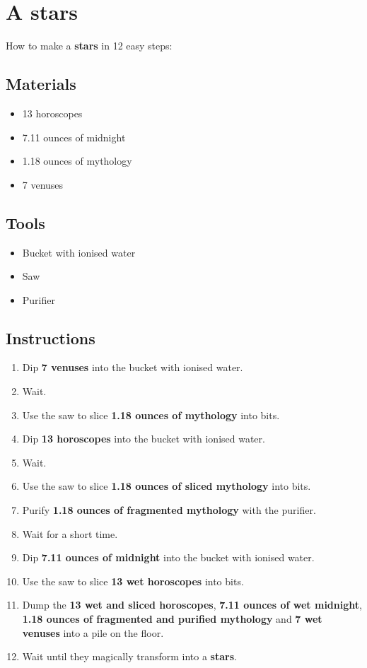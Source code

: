 \documentclass{article}
\begin{document}
\section{A stars}How to make a \textbf{stars} in 12 easy steps:

\subsection{Materials}\begin{itemize}
\item 
13 horoscopes
\item 
7.11 ounces of midnight
\item 
1.18 ounces of mythology
\item 
7 venuses
\end{itemize}
\subsection{Tools}\begin{itemize}
\item 
Bucket with ionised water
\item 
Saw
\item 
Purifier
\end{itemize}
\subsection{Instructions}\begin{enumerate}
\item 
Dip \textbf{7 venuses} into the bucket with ionised water.
\item 
Wait.
\item 
Use the saw to slice \textbf{1.18 ounces of mythology} into bits.
\item 
Dip \textbf{13 horoscopes} into the bucket with ionised water.
\item 
Wait.
\item 
Use the saw to slice \textbf{1.18 ounces of sliced mythology} into bits.
\item 
Purify \textbf{1.18 ounces of fragmented mythology} with the purifier.
\item 
Wait for a short time.
\item 
Dip \textbf{7.11 ounces of midnight} into the bucket with ionised water.
\item 
Use the saw to slice \textbf{13 wet horoscopes} into bits.
\item 
Dump the \textbf{13 wet and sliced horoscopes}, \textbf{7.11 ounces of wet midnight}, \textbf{1.18 ounces of fragmented and purified mythology} and \textbf{7 wet venuses} into a pile on the floor.
\item 
Wait until they magically transform into a \textbf{stars}.
\end{enumerate}
\newpage
\end{document}
